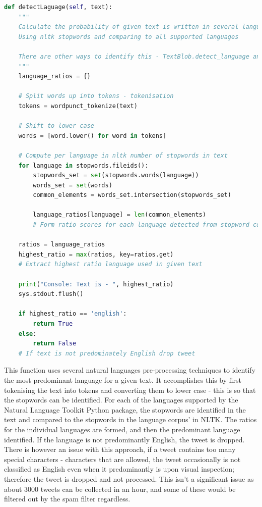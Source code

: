 \documentclass[oneside, 12pt]{article}
\begin{document}
			\begin{lstlisting}[language=python, caption=Language detection and filter function \cite{38}]
def detectLaguage(self, text):
	"""
	Calculate the probability of given text is written in several languages
	Using nltk stopwords and comparing to all supported languages

	There are other ways to identify this - TextBlob.detect_language and Ngrams
	"""
	language_ratios = {}
	
	# Split words up into tokens - tokenisation
	tokens = wordpunct_tokenize(text)
	
	# Shift to lower case
	words = [word.lower() for word in tokens]

	# Compute per language in nltk number of stopwords in text
	for language in stopwords.fileids():
		stopwords_set = set(stopwords.words(language))
		words_set = set(words)
		common_elements = words_set.intersection(stopwords_set)

		language_ratios[language] = len(common_elements) 
		# Form ratio scores for each language detected from stopword comparison

	ratios = language_ratios
	highest_ratio = max(ratios, key=ratios.get)
	# Extract highest ratio language used in given text

	print("Console: Text is - ", highest_ratio)
	sys.stdout.flush()

	if highest_ratio == 'english':
		return True
	else:
		return False
	# If text is not predominately English drop tweet
			\end{lstlisting}
			
			This function uses several natural languages pre-processing techniques to identify the most predominant language for a given text. It accomplishes this by first tokenising the text into tokens and converting them to lower case - this is so that the stopwords can be identified. For each of the languages supported by the Natural Language Toolkit Python package, the stopwords are identified in the text and compared to the stopwords in the language corpus' in NLTK. The ratios for the individual languages are formed, and then the predominant language identified. If the language is not predominantly English, the tweet is dropped. There is however an issue with this approach, if a tweet contains too many special characters - characters that are allowed, the tweet occasionally is not classified as English even when it predominantly is upon visual inspection; therefore the tweet is dropped and not processed. This isn't a significant issue as about 3000 tweets can be collected in an hour, and some of these would be filtered out by the spam filter regardless.
			
\end{document}
